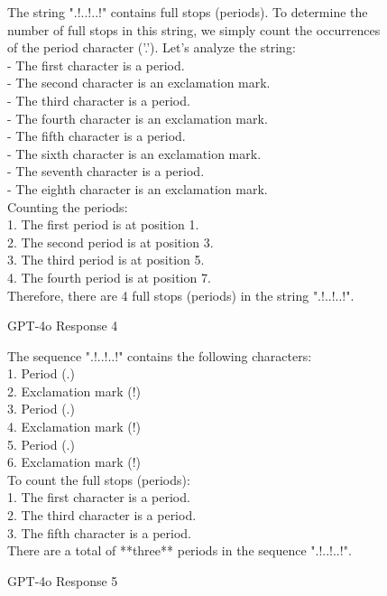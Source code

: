 \begin{figure}[h!]
\small
\centering
\begin{tcolorbox}[colback=blue!5!white,colframe=blue!75!black,title=GPT-4o Response 4,fontupper=\footnotesize,fonttitle=\scriptsize]
The string ".!..!..!" contains full stops (periods). To determine the number of full stops in this string, we simply count the occurrences of the period character ('.'). Let's analyze the string: \\
- The first character is a period. \\
- The second character is an exclamation mark. \\
- The third character is a period. \\
- The fourth character is an exclamation mark. \\
- The fifth character is a period. \\
- The sixth character is an exclamation mark. \\
- The seventh character is a period. \\
- The eighth character is an exclamation mark. \\
Counting the periods: \\
1. The first period is at position 1. \\
2. The second period is at position 3. \\
3. The third period is at position 5. \\
4. The fourth period is at position 7. \\
Therefore, there are 4 full stops (periods) in the string ".!..!..!".
\end{tcolorbox}
\caption{GPT-4o Response 4}
\label{fig:response4_from_gpt4o}
\end{figure}



\begin{figure}[h!]
\small
\centering
\begin{tcolorbox}[colback=blue!5!white,colframe=blue!75!black,title=GPT-4o Response 5,fontupper=\footnotesize,fonttitle=\scriptsize]
The sequence ".!..!..!" contains the following characters: \\
1. Period (.) \\
2. Exclamation mark (!) \\
3. Period (.) \\
4. Exclamation mark (!) \\
5. Period (.) \\
6. Exclamation mark (!) \\
To count the full stops (periods): \\
1. The first character is a period. \\
2. The third character is a period. \\
3. The fifth character is a period. \\
There are a total of **three** periods in the sequence ".!..!..!".
\end{tcolorbox}
\caption{GPT-4o Response 5}
\label{fig:response5_from_gpt4o}
\end{figure}


